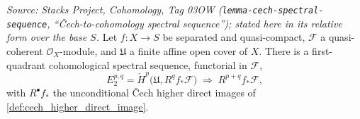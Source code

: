 \begin{lemma}
  \label{lem:cech_to_derived_pushforward_ss}
  \textit{Source: Stacks Project, Cohomology, Tag 03OW
  (\texttt{lemma-cech-spectral-sequence}, ``{\v C}ech-to-cohomology spectral
  sequence''); stated here in its relative form over the base \(S\).}
  Let \(f : X \to S\) be separated and quasi-compact, \(\mathcal{F}\) a quasi-coherent
  \(\mathcal{O}_X\)-module, and \(\mathfrak{U}\) a finite affine open cover of \(X\).
  There is a first-quadrant cohomological spectral sequence, functorial in
  \(\mathcal{F}\),
  \[
    E_2^{p,q} = \check{H}^p\bigl(\mathfrak{U}, R^q f_*\mathcal{F}\bigr)
    \;\Longrightarrow\; R^{p+q} f_*\mathcal{F},
  \]
  with \(R^\bullet f_*\) the unconditional {\v C}ech higher direct images of
  \cref{def:cech_higher_direct_image}.
\end{lemma}

